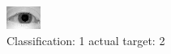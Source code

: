\begin{figure}[h!]
\begin{center}
\includegraphics[width=0.60\columnwidth]{figures/ID896_class_1_target_2.png}
\end{center}
\caption{ Classification: 1 actual target: 2}
\label{fig:ID896_class_1_target_2}
\end{figure}
